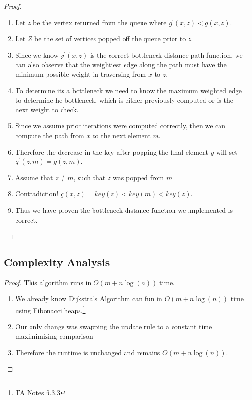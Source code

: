 \documentclass{article}
\begin{document}
\begin{proof}
\begin{enumerate}
\begin{enumerate}
                        \item Let \(z\) be the vertex returned from the queue where
                              \(g^{\prime}(x, z) < g(x,
                              z)\).
                        \item   Let \(Z\) be the set of vertices popped off the queue
                              prior to \(z\).
                        \item Since we know \(g^{\prime}(x,z)\) is the correct bottleneck
                              distance path function, we can also observe that the
                              weightiest edge along the path must have the minimum
                              possible weight in traversing from \(x\) to \(z\).
                        \item To determine its a bottleneck we need to know the maximum
                              weighted edge to determine he bottleneck, which is either
                              previously computed or is the next weight to check.
                        \item Since we assume prior iterations were computed correctly,
                              then we can compute the path from \(x\) to the next element
                              \(m\).
                        \item Therefore the decrease in the key after popping the final
                              element \(y\) will set \(g^{\prime}(z,m) = g(z, m)\).
                        \item Assume that \(z \neq m\), such that \(z\) was popped from \(m\).
                        \item Contradiction! \(g(x, z) = key(z) < key(m) < key(z)\).
                        \item Thus we have proven the bottleneck distance function we
                              implemented is correct.
                  \end{enumerate}
      \end{enumerate}

\end{proof}

\subsection{Complexity Analysis}
\begin{proof} This algorithm runs in \(O(m + n \log (n))\) time.\begin{enumerate}
            \item We already know Dijkstra's Algorithm can fun in \(O(m + n \log (n))\)
                  time using Fibonacci heaps.\footnote{TA Notes 6.3.3}
            \item Our only change was swapping the update rule to a constant time
                  maximimizing comparison.
            \item Therefore the runtime is unchanged and remains \(O(m + n \log (n))\).
      \end{enumerate}

\end{proof}
\newpage
\end{document}
